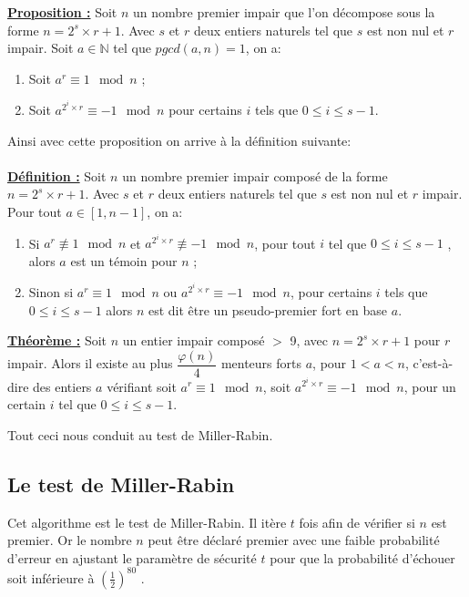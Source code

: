 \underline{\textbf{Proposition :}} Soit $n$ un nombre premier impair que l’on décompose sous la forme $n= 2^s \times r +1$. Avec $s$ et $r$ deux entiers naturels tel que $s$ est non nul et $r$ impair. Soit $a \in \mathbb{N}$ tel que $pgcd(a,n)=1$, on a: 
\begin{enumerate}[label=\roman*)]
 \item  Soit  $a^r \equiv 1 \mod n$ ;
 \item  Soit $ a^{2^{i}\times r} \equiv -1 \mod n$ pour certains $i$ tels que $0\leq i \leq s-1$.
\end{enumerate}

Ainsi avec cette proposition on arrive à la définition suivante:\\ \\
\underline{\textbf{Définition :}}
Soit $n$ un nombre premier impair composé de la forme $n= 2^s\times r +1$. Avec $s$ et $r$ deux entiers naturels tel que $s$ est non nul et $r$ impair. Pour tout $a \in [1,n-1]$, on a: 
\begin{enumerate}[label=\roman*)]
 \item  Si $a^r \not\equiv 1 \mod n$ et $ a^{2^{i}\times r} \not\equiv -1 \mod n$, pour tout $i$ tel que $0\leq i \leq s-1$ , alors $a$ est un témoin pour $n$ ; 
 \item  Sinon si $a^r \equiv 1 \mod n$ ou $ a^{2^{i}\times r} \equiv -1 \mod n$, pour certains $i$ tels que $0\leq i \leq s-1$ alors $n$ est dit être un pseudo-premier fort en base $a$.
\end{enumerate}

\underline{\textbf{Théorème :}} Soit $n$ un entier impair composé $>$ 9, avec $n= 2^s\times r +1 $ pour $r$ impair. Alors il existe au plus $\dfrac{\varphi(n)}{4}$ menteurs forts $a$, pour $1<a<n$, c'est-à-dire des entiers $a$ vérifiant soit $a^r \equiv 1 \mod n$, soit $ a^{2^{i}\times r} \equiv -1 \mod n$, pour un certain $i$ tel que $0\leq i \leq s-1$.

Tout ceci nous conduit au test de Miller-Rabin.


\subsection{Le test de Miller-Rabin} 

Cet algorithme est le test de Miller-Rabin. Il itère $t$ fois afin de vérifier si $n$ est premier. Or le nombre $n$ peut être déclaré premier avec une faible probabilité d'erreur en ajustant le paramètre de sécurité $t$ pour que la probabilité d'échouer soit inférieure à $\left(\frac{1}{2}\right)^{80}$ .


